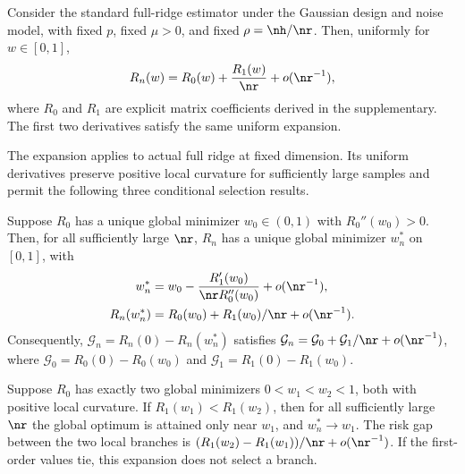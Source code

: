 \begin{theorem}\label{thm:t1c}
Consider the standard full-ridge estimator under the Gaussian design and noise model, with fixed $p$, fixed $\mu>0$, and fixed $\rho=\nh/\nr$. Then, uniformly for $w\in[0,1]$,
\begin{equation}
  R_n(w)=R_0(w)+\frac{R_1(w)}{\nr}+o(\nr^{-1}),
  \label{eq:t1c-main}
\end{equation}
where $R_0$ and $R_1$ are explicit matrix coefficients derived in the supplementary. The first two derivatives satisfy the same uniform expansion.
\end{theorem}

The expansion applies to actual full ridge at fixed dimension. Its uniform derivatives preserve positive local curvature for sufficiently large samples and permit the following three conditional selection results.

\begin{theorem}\label{thm:optfull}
Suppose $R_0$ has a unique global minimizer $w_0\in(0,1)$ with $R_0''(w_0)>0$. Then, for all sufficiently large $\nr$, $R_n$ has a unique global minimizer $w_n^*$ on $[0,1]$, with
\begin{align}
 w_n^*&=w_0-\frac{R_1'(w_0)}{\nr R_0''(w_0)}+o(\nr^{-1}),\notag\\
 R_n(w_n^*)&=R_0(w_0)+R_1(w_0)/\nr+o(\nr^{-1}).
 \label{eq:optfull-main}
\end{align}
Consequently, $\mathcal G_n=R_n(0)-R_n(w_n^*)$ satisfies $\mathcal G_n=\mathcal G_0+\mathcal G_1/\nr+o(\nr^{-1})$, where $\mathcal G_0=R_0(0)-R_0(w_0)$ and $\mathcal G_1=R_1(0)-R_1(w_0)$.
\end{theorem}

\begin{theorem}\label{thm:branchselect}
Suppose $R_0$ has exactly two global minimizers $0<w_1<w_2<1$, both with positive local curvature. If $R_1(w_1)<R_1(w_2)$, then for all sufficiently large $\nr$ the global optimum is attained only near $w_1$, and $w_n^*\to w_1$. The risk gap between the two local branches is $(R_1(w_2)-R_1(w_1))/\nr+o(\nr^{-1})$. If the first-order values tie, this expansion does not select a branch.
\end{theorem}

